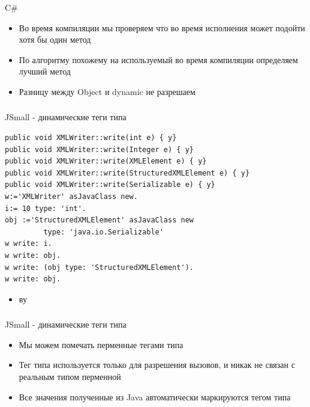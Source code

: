 \documentclass[t]{beamer}  %
\begin{document}
\begin{frame}[fragile]
	\frametitle{\insertsection} 
  	\framesubtitle{\insertsubsection}
    \begin{block}{C\#}
\begin{itemize}
\item Во время компиляции мы проверяем что во время исполнения может подойти хотя бы один метод
\item По алгоритму похожему на используемый во время компиляции определяем лучший метод
\item Разницу между Object и dynamic не разрешаем
\end{itemize}
    \end{block}
\end{frame}

\begin{frame}[fragile]
	\frametitle{\insertsection} 
  	\framesubtitle{\insertsubsection}
    \begin{block}{JSmall - динамические теги типа}
    	    \begin{verbatim}
public void XMLWriter::write(int e) { y}
public void XMLWriter::write(Integer e) { y}
public void XMLWriter::write(XMLElement e) { y}
public void XMLWriter::write(StructuredXMLElement e) { y}
public void XMLWriter::write(Serializable e) { y}
w:='XMLWriter' asJavaClass new.
i:= 10 type: 'int'.
obj :='StructuredXMLElement' asJavaClass new
         type: 'java.io.Serializable'
w write: i.
w write: obj.
w write: (obj type: 'StructuredXMLElement').
w write: obj.
		\end{verbatim}
\begin{itemize}
\item ву
\end{itemize}
    \end{block}
\end{frame}

\begin{frame}[fragile]
	\frametitle{\insertsection} 
  	\framesubtitle{\insertsubsection}
    \begin{block}{JSmall - динамические теги типа}
\begin{itemize}
\item Мы можем помечать перменные тегами типа
\item Тег типа используется только для разрешения вызовов, и никак не связан с реальным типом перменной
\item Все значения полученные из Java автоматически маркируются тегом типа
\end{itemize}
    \end{block}
\end{frame}
\end{document}
